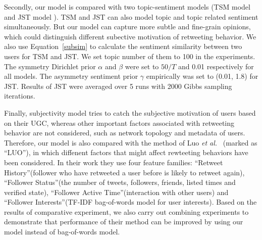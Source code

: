\documentclass{acm_proc_article-sp}
\begin{document}
Secondly, our model is compared with two topic-sentiment models (TSM model \cite{mei2007topic} and JST model \cite{lin2009joint}). TSM and JST can also model topic and topic related sentiment simultaneously. But our model can capture more subtle and fine-grain opinions, which could distinguish different subective motivation of retweeting behavior. We also use Equation~\ref{subsim} to calculate the sentiment similarity between two users for TSM and JST. We set topic number of them to 100 in the experiments. The symmetry Dirichlet prior $ \alpha $ and $ \beta $ were set to $ 50/T $ and 0.01 respectively for all models. The asymmetry sentiment prior $ \gamma $ empirically was set to (0.01, 1.8) for JST. Results of JST were averaged over 5 runs with 2000 Gibbs sampling iterations.

Finally, subjectivity model tries to catch the subjective motivation of users based on their UGC, whereas other important factors associated with retweeting behavior are not considered, such as network topology and metadata of users. 
Therefore, our model is also compared with the method of Luo \emph{et al.}~ (marked as ``LUO''), in which diffenent factors that might affect rewteeting behaviors have been considered.
In their work they use four feature families: ``Retweet History''(follower who have retweeted a user before is likely to retweet again), ``Follower Status''(the number of tweets, followers, friends, listed times and verified state), ``Follower Active Time''(interaction with other users) and ``Follower Interests''(TF-IDF bag-of-words model for user interests). 
Based on the results of comparative experiment, we also carry out combining experiments to demonstrate that performance of their method can be improved by using our model instead of bag-of-words model. 
\end{document}
